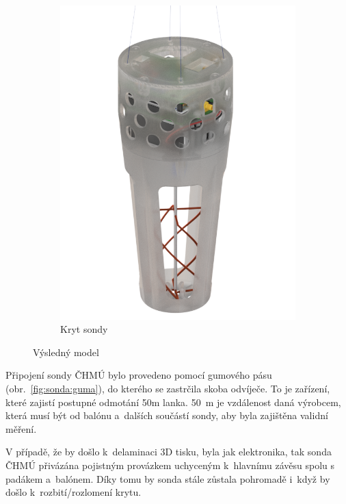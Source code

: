 \documentclass[twoside]{ctuthesis}
\theoremstyle{plain}
\theoremstyle{definition}
\theoremstyle{note}
\begin{document}
\begin{figure}[hbtp]
\begin{subfigure}{.49\textwidth}
			\includegraphics[width = .85\textwidth]{Figures/sonda_case.png}
			\caption{Kryt sondy}
			\label{fig:sondacase}
		\end{subfigure}
		\caption{Výsledný model}
		\label{fig:sonda:final}
	\end{figure}


	Připojení sondy ČHMÚ bylo provedeno pomocí gumového pásu (obr.~\ref{fig:sonda:guma}), do kterého se zastrčila skoba odvíječe. To je zařízení, které zajistí postupné odmotání 50m lanka. 50~m je vzdálenost daná výrobcem, která musí být od balónu a~dalších součástí sondy, aby byla zajištěna validní měření.

	

	V případě, že by došlo k~delaminaci 3D tisku, byla jak elektronika, tak sonda ČHMÚ přivázána pojistným provázkem uchyceným k~hlavnímu závěsu spolu s padákem a~balónem. Díky tomu by sonda stále zůstala pohromadě i~když by došlo k~rozbití/rozlomení krytu.

\end{document}

